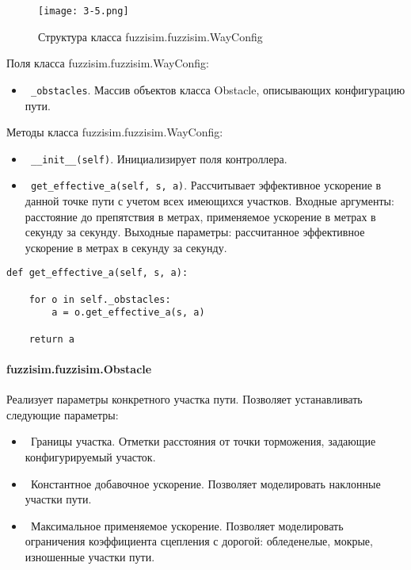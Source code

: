 \begin{figure}[ht]
	\centering
	\texttt{[image: 3-5.png]}
	\caption{ Структура класса fuzzisim.fuzzisim.WayConfig}
\end{figure}

Поля класса fuzzisim.fuzzisim.WayConfig:
\begin{itemize}
	\item \lstinline! _obstacles!. Массив объектов класса Obstacle, описывающих конфигурацию пути.
\end{itemize}
Методы класса fuzzisim.fuzzisim.WayConfig:
\begin{itemize}
	\item \lstinline! __init__(self)!. Инициализирует поля контроллера.
	\item \lstinline! get_effective_a(self, s, a)!.  Рассчитывает эффективное ускорение в данной точке пути с учетом всех имеющихся участков. Входные аргументы: расстояние до препятствия в метрах, применяемое ускорение в метрах в секунду за секунду. Выходные параметры: рассчитанное эффективное ускорение в метрах в секунду за секунду.
\end{itemize}

\begin{lstlisting}[style=pythonstyle,caption={  }, label=lst:func:1]
def get_effective_a(self, s, a):

	for o in self._obstacles:
		a = o.get_effective_a(s, a)

	return a
\end{lstlisting}




\paragraph{fuzzisim.fuzzisim.Obstacle}

Реализует параметры конкретного участка пути. Позволяет устанавливать следующие параметры:
\begin{itemize}
	\item \lstinline! !Границы участка. Отметки расстояния от точки торможения, задающие конфигурируемый участок.
	\item \lstinline! !Константное добавочное ускорение. Позволяет моделировать наклонные участки пути.
	\item \lstinline! !Максимальное применяемое ускорение. Позволяет моделировать ограничения коэффициента сцепления с дорогой: обледенелые, мокрые, изношенные участки пути.
\end{itemize}


